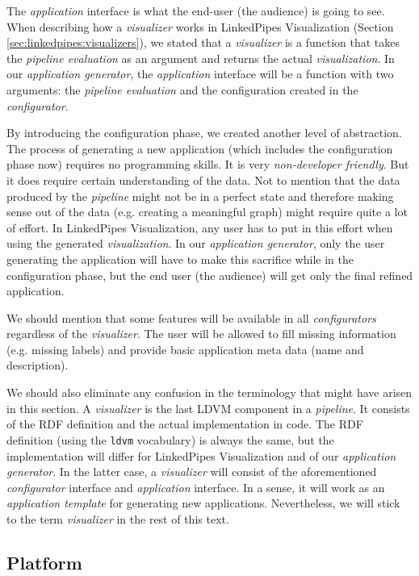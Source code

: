 The \emph{application} interface is what the end-user (the audience) is going to see. When describing how a \emph{visualizer} works in LinkedPipes Visualization (Section \ref{sec:linkedpipes:visualizers}), we stated that a \emph{visualizer} is a function that takes the \emph{pipeline evaluation} as an argument and returns the actual \emph{visualization}. In our \emph{application generator}, the \emph{application} interface will be a function with two arguments: the \emph{pipeline evaluation} and the configuration created in the \emph{configurator}.

By introducing the configuration phase, we created another level of abstraction. The process of generating a new application (which includes the configuration phase now) requires no programming skills. It is very \emph{non-developer friendly}. But it does require certain understanding of the data. Not to mention that the data produced by the \emph{pipeline} might not be in a perfect state and therefore making sense out of the data (e.g. creating a meaningful graph) might require quite a lot of effort. In LinkedPipes Visualization, any user has to put in this effort when using the generated \emph{visualization}. In our \emph{application generator}, only the user generating the application will have to make this sacrifice while in the configuration phase, but the end user (the audience) will get only the final refined application.

We should mention that some features will be available in all \emph{configurators} regardless of the \emph{visualizer}. The user will be allowed to fill missing information (e.g. missing labels) and provide basic application meta data (name and description).

We should also eliminate any confusion in the terminology that might have arisen in this section. A \emph{visualizer} is the last LDVM component in a \emph{pipeline}. It consists of the RDF definition and the actual implementation in code. The RDF definition (using the \texttt{ldvm} vocabulary) is always the same, but the implementation will differ for LinkedPipes Visualization and of our \emph{application generator}. In the latter case, a \emph{visualizer} will consist of the aforementioned \emph{configurator} interface and \emph{application} interface. In a sense, it will work as an \emph{application template} for generating new applications. Nevertheless, we will stick to the term \emph{visualizer} in the rest of this text.

\subsection{Platform}

